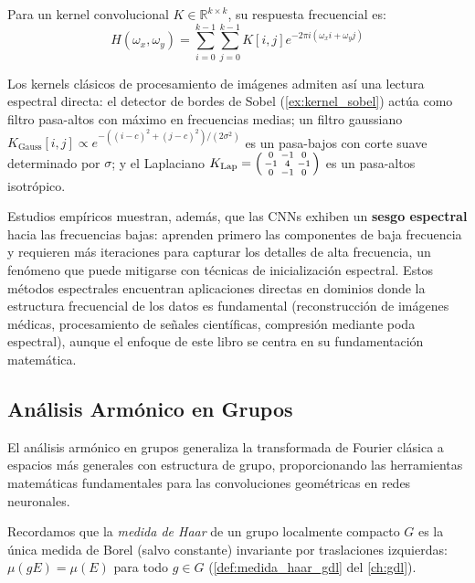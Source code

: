 \begin{definition}\label{def:respuesta_frecuencial_kernel}
Para un kernel convolucional $K \in \mathbb{R}^{k \times k}$, su respuesta frecuencial es:
\begin{equation}
H(\omega_x, \omega_y) = \sum_{i=0}^{k-1} \sum_{j=0}^{k-1} K[i,j] e^{-2\pi i(\omega_x i + \omega_y j)}
\end{equation}
\end{definition}

Los kernels clásicos de procesamiento de imágenes admiten así una lectura espectral directa: el detector de bordes de Sobel (\autoref{ex:kernel_sobel}) actúa como filtro pasa-altos con máximo en frecuencias medias; un filtro gaussiano $K_{\text{Gauss}}[i,j] \propto e^{-((i-c)^2 + (j-c)^2)/(2\sigma^2)}$ es un pasa-bajos con corte suave determinado por $\sigma$; y el Laplaciano $K_{\text{Lap}} = \begin{psmallmatrix} 0 & -1 & 0 \\ -1 & 4 & -1 \\ 0 & -1 & 0 \end{psmallmatrix}$ es un pasa-altos isotrópico.

Estudios empíricos muestran, además, que las CNNs exhiben un \textbf{sesgo espectral} hacia las frecuencias bajas: aprenden primero las componentes de baja frecuencia y requieren más iteraciones para capturar los detalles de alta frecuencia, un fenómeno que puede mitigarse con técnicas de inicialización espectral. Estos métodos espectrales encuentran aplicaciones directas en dominios donde la estructura frecuencial de los datos es fundamental (reconstrucción de imágenes médicas, procesamiento de señales científicas, compresión mediante poda espectral), aunque el enfoque de este libro se centra en su fundamentación matemática.

\subsection{Análisis Armónico en Grupos}\label{subsec:analisis_armonico_grupos}

El análisis armónico en grupos generaliza la transformada de Fourier clásica a espacios más generales con estructura de grupo, proporcionando las herramientas matemáticas fundamentales para las convoluciones geométricas en redes neuronales.

Recordamos que la \textit{medida de Haar} de un grupo localmente compacto $G$ es la única medida de Borel (salvo constante) invariante por traslaciones izquierdas: $\mu(gE) = \mu(E)$ para todo $g \in G$ (\autoref{def:medida_haar_gdl} del \autoref{ch:gdl}).\label{def:medida_haar}


